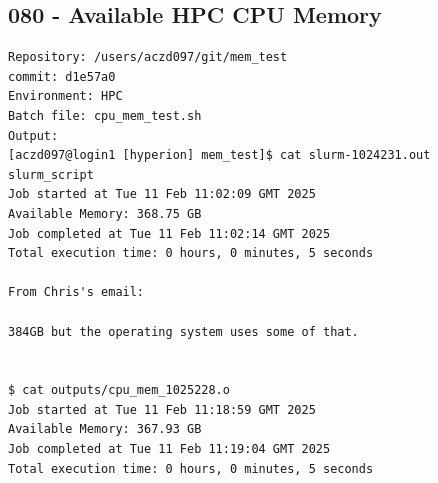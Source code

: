 





\subsection{080 - Available HPC CPU Memory}
\label{app_res:080}
\begin{verbatim}
Repository: /users/aczd097/git/mem_test
commit: d1e57a0
Environment: HPC 
Batch file: cpu_mem_test.sh
Output:
[aczd097@login1 [hyperion] mem_test]$ cat slurm-1024231.out
slurm_script
Job started at Tue 11 Feb 11:02:09 GMT 2025
Available Memory: 368.75 GB
Job completed at Tue 11 Feb 11:02:14 GMT 2025
Total execution time: 0 hours, 0 minutes, 5 seconds

From Chris's email:

384GB but the operating system uses some of that.


$ cat outputs/cpu_mem_1025228.o
Job started at Tue 11 Feb 11:18:59 GMT 2025
Available Memory: 367.93 GB
Job completed at Tue 11 Feb 11:19:04 GMT 2025
Total execution time: 0 hours, 0 minutes, 5 seconds

\end{verbatim}

